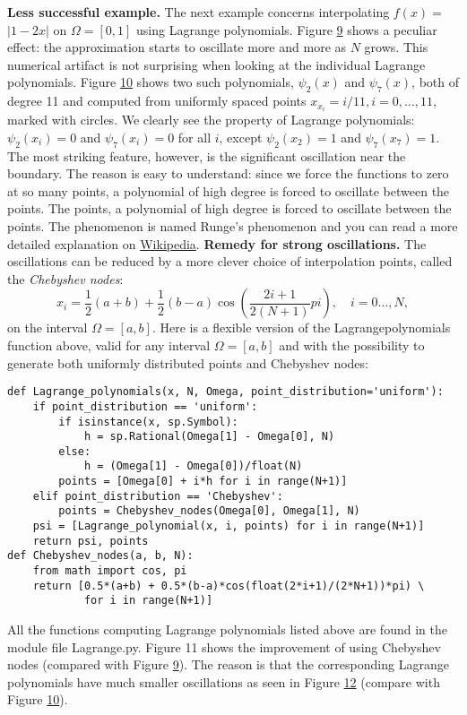 \documentclass[../main.tex]{subfiles}
\begin{document}
\noindent \textbf{Less successful example.} The next example concerns interpolating $f(x)=$ $|1-2 x|$ on $\Omega=[0,1]$ using Lagrange polynomials. Figure \hyperref[fig:img_9]{9} shows a peculiar effect: the approximation starts to oscillate more and more as $N$ grows. This numerical artifact is not surprising when looking at the individual Lagrange polynomials. Figure \hyperref[fig:img_10]{10} shows two such polynomials, $\psi_{2}(x)$ and $\psi_{7}(x)$, both of degree 11 and computed from uniformly spaced points $x_{x_{i}}=i / 11, i=0, \ldots, 11$, marked with circles. We clearly see the property of Lagrange polynomials: $\psi_{2}\left(x_{i}\right)=0$ and $\psi_{7}\left(x_{i}\right)=0$ for all $i$, except $\psi_{2}\left(x_{2}\right)=1$ and $\psi_{7}\left(x_{7}\right)=1$. The most striking feature, however, is the significant oscillation near the boundary. The reason is easy to understand: since we force the functions to zero at so many points, a polynomial of high degree is forced to oscillate between the points. The points, a polynomial of high degree is forced to oscillate between the points. The phenomenon is named Runge's phenomenon and you can read a more detailed explanation on \href{https://en.wikipedia.org/wiki/Runge%27s_phenomenon}{Wikipedia}.
\bigbreak
\noindent \textbf{Remedy for strong oscillations.} The oscillations can be reduced by a more clever choice of interpolation points, called the \textit{Chebyshev nodes}:
\begin{equation}\label{eqa50}
	x_{i}=\frac{1}{2}(a+b)+\frac{1}{2}(b-a) \cos \left(\frac{2 i+1}{2(N+1)} p i\right), \quad i=0 \ldots, N,
\end{equation}
on the interval $\Omega=[a, b]$. Here is a flexible version of the Lagrange\textunderscore polynomials function above, valid for any interval $\Omega=[a, b]$ and with the possibility to generate both uniformly distributed points and Chebyshev nodes:
\begin{lstlisting}[numbers=none]
def Lagrange_polynomials(x, N, Omega, point_distribution='uniform'):
	if point_distribution == 'uniform':
		if isinstance(x, sp.Symbol):
			h = sp.Rational(Omega[1] - Omega[0], N)
		else:
			h = (Omega[1] - Omega[0])/float(N)
		points = [Omega[0] + i*h for i in range(N+1)]
	elif point_distribution == 'Chebyshev':
		points = Chebyshev_nodes(Omega[0], Omega[1], N)
	psi = [Lagrange_polynomial(x, i, points) for i in range(N+1)]
	return psi, points
def Chebyshev_nodes(a, b, N):
	from math import cos, pi
	return [0.5*(a+b) + 0.5*(b-a)*cos(float(2*i+1)/(2*N+1))*pi) \
			for i in range(N+1)]
\end{lstlisting}
All the functions computing Lagrange polynomials listed above are found in the module file Lagrange.py. Figure 11 shows the improvement of using Chebyshev nodes (compared with Figure \hyperref[fig:img_9]{9}). The reason is that the corresponding Lagrange polynomials have much smaller oscillations as seen in Figure \hyperref[fig:img_12]{12} (compare with Figure \hyperref[fig:img_10]{10}).
\end{document}
